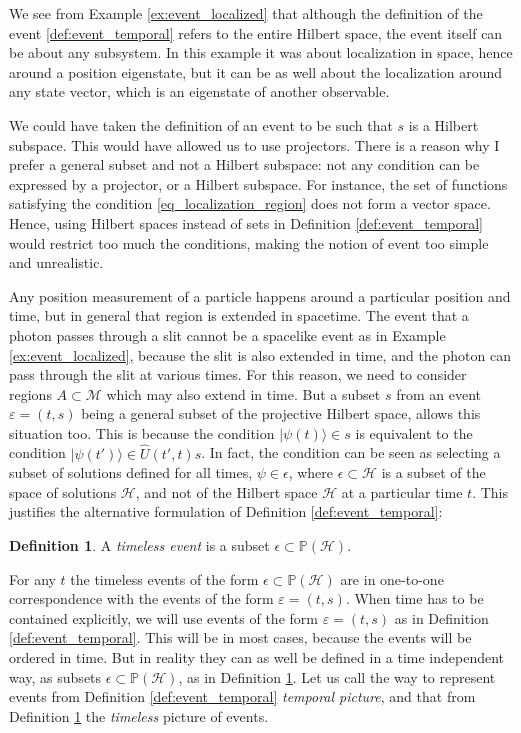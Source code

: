 \documentclass[12pt]{amsart}
\theoremstyle{definition}
\newtheorem{definition}{Definition}[section]
\theoremstyle{plain}
\begin{document}
We see from Example \ref{ex:event_localized} that although the definition of the event \ref{def:event_temporal} refers to the entire Hilbert space, the event itself can be about any subsystem. In this example it was about localization in space, hence around a position eigenstate, but it can be as well about the localization around any state vector, which is an eigenstate of another observable.

We could have taken the definition of an event to be such that $s$ is a Hilbert subspace. This would have allowed us to use projectors. There is a reason why I prefer a general subset and not a Hilbert subspace: not any condition can be expressed by a projector, or a Hilbert subspace. For instance, the set of functions satisfying the condition \eqref{eq_localization_region} does not form a vector space. Hence, using Hilbert spaces instead of sets in Definition \ref{def:event_temporal} would restrict too much the conditions, making the notion of event too simple and unrealistic.

Any position measurement of a particle happens around a particular position and time, but in general that region is extended in spacetime. 
The event that a photon passes through a slit cannot be a spacelike event as in Example \ref{ex:event_localized}, because the slit is also extended in time, and the photon can pass through the slit at various times. For this reason, we need to consider regions $A\subset\mathcal M$ which may also extend in time. But a subset $s$ from an event $\varepsilon=(t,s)$ being a general subset of the projective Hilbert space, allows this situation too. This is because the condition $|{\psi(t)}\rangle\in s$ is equivalent to the condition $|{\psi(t')}\rangle\in \hat U(t',t)s$. In fact, the condition can be seen as selecting a subset of solutions defined for all times, $\psi\in\epsilon$, where $\epsilon\subset\mathscr{H}$ is a subset of the space of solutions $\mathscr{H}$, and not of the Hilbert space $\mathcal{H}$ at a particular time $t$.
This justifies the alternative formulation of Definition \ref{def:event_temporal}:

\begin{definition}
\label{def:event_timeless}
A \emph{timeless event} is a subset $\epsilon\subset\mathbb P(\mathscr{H})$. 
\end{definition}

For any $t$ the timeless events of the form $\epsilon\subset\mathbb P(\mathscr{H})$ are in one-to-one correspondence with the events of the form $\varepsilon=(t,s)$. When time has to be contained explicitly, we will use events of the form $\varepsilon=(t,s)$ as in Definition \ref{def:event_temporal}. This will be in most cases, because the events will be ordered in time. But in reality they can as well be defined in a time independent way, as subsets $\epsilon\subset\mathbb P(\mathscr{H})$, as in Definition \ref{def:event_timeless}.
Let us call the way to represent events from Definition \ref{def:event_temporal} \emph{temporal picture}, and that from Definition \ref{def:event_timeless} the \emph{timeless} picture of events.
\end{document}
